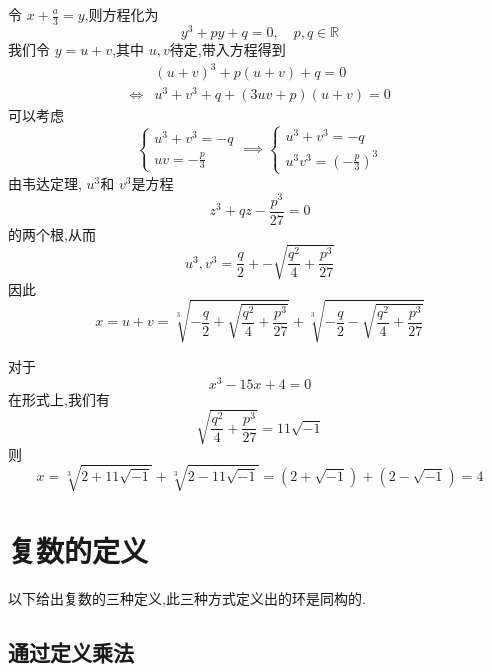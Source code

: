 \documentclass[../../复变函数.tex]{subfiles}
\begin{document}
\begin{solution}
    令 \(  x+  \frac{a}{3} = y  \),则方程化为 \[
    y^{3} +  py+ q = 0,\quad  p,q \in \mathbb{R} 
    \] 我们令 \(  y =  u+ v  \),其中 \(  u,v  \)待定,带入方程得到 \[
   \begin{aligned}
  &  \left( u+ v \right)^{3}+ p \left( u+ v \right)+  q= 0 \\ 
\iff  & u^{3}+ v^{3}+ q + \left( 3uv + p \right)\left( u+ v \right)= 0    
   \end{aligned}
    \]  可以考虑 \[
    \begin{cases} u^{3}+ v^{3}= -q\\ 
      uv=  - \frac{p}{3} \end{cases} \implies \begin{cases} u^{3}+ v^{3}= -q\\ 
        u^{3}v^{3} =  \left( - \frac{p}{3} \right)^{3}  \end{cases} 
    \]由韦达定理, \(  u^{3}  \)和 \(  v^{3}  \)是方程 \[
    z ^{3} + qz-  \frac{p^{3} }{27 }= 0 
    \]的两个根,从而 \[
    u^{3},v^{3}   = \frac{q }{2 } + -\sqrt{\frac{q^{2} }{4 }+  \frac{p^{3} }{27 }  } 
    \]  因此 \[
    x =  u+ v =  \sqrt[3]{- \frac{q   }{2 }+  \sqrt{ \frac{q^{2}    }{4 }+  \frac{p^{3} }{27 }  } } +  \sqrt[3]{-\frac{q }{2 } -\sqrt{ \frac{q^{2}     }{4 }+  \frac{p^{3} }{27 }  } }
    \]
\end{solution}

\hspace*{\fill} 

\begin{example}
    对于 \[
    x^{3}-15x+  4= 0
    \]在形式上,我们有 \[
    \sqrt{\frac{q^{2} }{4 }+  \frac{p^{3} }{27 }  } =  11\sqrt{-1}
    \]则 \[
     x =  \sqrt[3]{2+ 11\sqrt{-1} } +  \sqrt[3]{2-11\sqrt{-1}}=  \left( 2+ \sqrt{-1} \right) +  \left( 2-\sqrt{-1} \right)= 4  
    \]
\end{example}

\hspace*{\fill} 

\section{复数的定义}

以下给出复数的三种定义,此三种方式定义出的环是同构的.

\subsection{通过定义乘法}
\end{document}
